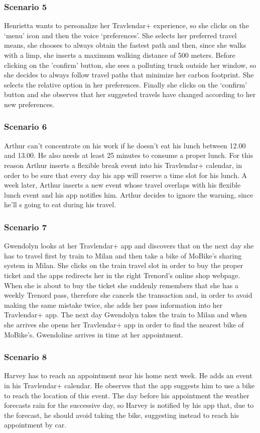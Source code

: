 	\subsubsection{Scenario 5}
		Henrietta wants to personalize her Travlendar+ experience, so she clicks on the ‘menu’ icon and then the voice ‘preferences’. She selects her preferred travel means, she chooses to always obtain the fastest path and then, since she walks with a limp, she inserts a maximum walking distance of 500 meters. Before clicking on the 'confirm' button, she sees a polluting truck outside her window, so she decides to always follow travel paths that minimize her carbon footprint. She selects the relative option in her preferences. Finally she clicks on the ‘confirm’ button and she observes that her suggested travels have changed according to her new preferences.
	\subsubsection{Scenario 6}
		Arthur can’t concentrate on his work if he doesn't eat his lunch between 12.00 and 13.00. He also needs at least 25 minutes to consume a proper lunch.
For this reason Arthur inserts a flexible break event into his Travlendar+ calendar, in order to be sure that every day his app will reserve a time slot for his lunch.
A week later, Arthur inserts a new event whose travel overlaps with his flexible lunch event and his app notifies him. Arthur decides to ignore the warning, since he'll s going to eat during his travel.
	\subsubsection{Scenario 7}
		Gwendolyn looks at her Travlendar+ app and discovers that on the next day she has to travel first by train to Milan and then take a bike of MoBike’s sharing system in Milan. She clicks on the train travel slot in order to buy the proper ticket and the apps redirects her in the right Trenord’s online shop webpage. When she is about to buy the ticket she suddenly remembers that she has a weekly Trenord pass, therefore she cancels the transaction and, in order to avoid making the same mistake twice, she adds her pass information into her Travlendar+ app. The next day Gwendolyn takes the train to Milan and when she arrives she opens her Travlendar+ app in order to find the nearest bike of MoBike’s. Gwendoline arrives in time at her appointment.
	\subsubsection{Scenario 8}
		Harvey has to reach an appointment near his home next week. He adds an event in his Travlendar+ calendar. He observes that the app suggests him to use a bike to reach the location of this event. The day before his appointment the weather forecasts rain for the successive day, so Harvey is notified by his app that, due to the forecast, he should avoid taking the bike, suggesting instead to reach his appointment by car.
